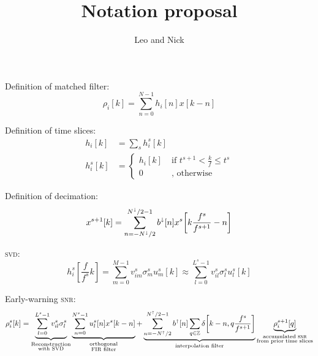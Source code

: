 \documentclass[letterpaper,11pt]{article}
\title{Notation proposal}
\author{Leo and Nick}
\begin{document}
\maketitle

Definition of matched filter:
\begin{equation}
\rho_i [k] = \sum_{n=0}^{N-1} h_{i}[n] x [k-n]
\end{equation}

Definition of time slices:
\begin{align}
h_{i}[k] &= \sum_s h_{i}^{s}[k] \\
h_{i}^{s}[k] &= \left\{ \begin{aligned}
    h_{i}[k] & \; \text{if } t^{s+1} < \frac{k}{f} \leq t^{s} \\
    0 & \; \text{, otherwise }
    \end{aligned} \right.
\end{align}

Definition of decimation:
\begin{equation}
x^{s+1}[k] = \sum_{n=-N^\shortdownarrow/2}^{N^\shortdownarrow/2-1} b^\shortdownarrow[n] x^{s}\!\left[k \frac{f^{s}}{f^{s+1}} - n\right]
\end{equation}

\textsc{svd}:
\begin{equation}
h^{s}_{i}\!\left[\frac{f}{f^{s}} k\right] = \sum_{m=0}^{M-1} v^{s}_{im} \sigma^{s}_m u^{s}_{m}[k] \approx \sum_{l=0}^{L^s-1} v^{s}_{il} \sigma^{s}_l u^{s}_{l}[k]
\end{equation}

Early-warning \textsc{snr}:
\begin{equation}
    \rho^{s}_i[k] = \underbrace{\sum_{l=0}^{L^{s}-1} v^{s}_{il} \sigma^{s}_l}_{\substack{\text{Reconstruction}\\ \text{with {\sc SVD}}}}
    \underbrace{\sum_{n=0}^{N^{s} - 1} u^{s}_{l}[n] x^{s}[k-n]}_{\substack{\text{orthogonal}\\ \text{{\sc FIR} filter}}} + \underbrace{\sum_{n=-N^\shortuparrow/2}^{N^\shortuparrow/2-1} b^\shortuparrow[n] \sum_{q \in \mathbb{Z}} \delta\!\left[k-n, q \frac{f^{s}}{f^{s+1}}\right]}_\text{interpolation filter} \underbrace{\rho^{s+1}_i[q]}_{\substack{\text{accumulated {\sc snr}}\\ \text{from prior time slices}}}
\end{equation}
\end{document}
